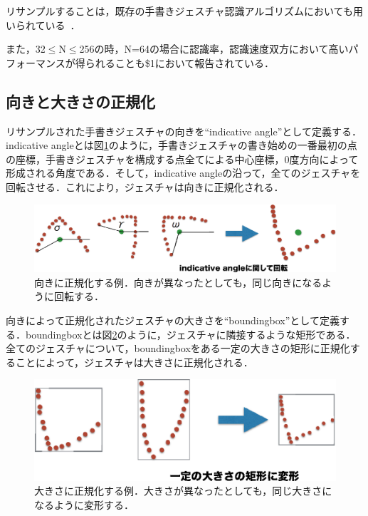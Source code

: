 リサンプルすることは，既存の手書きジェスチャ認識アルゴリズムにおいても用いられている~\cite{Plamondon:2000:OOH:331097.331275, Tappert:1990:SAO:83123.83137, Kristensson:2004:SLV:1029632.1029640, Zhai:2003:SWS:642611.642630, Tappert:1982:CSR:1664966.1664979}．


また，32$\leq$N$\leq$256の時，N=64の場合に認識率，認識速度双方において高いパフォーマンスが得られることも\$1において報告されている．

\subsection{向きと大きさの正規化}
リサンプルされた手書きジェスチャの向きを``indicative angle''として定義する．indicative angleとは図\ref{fig:orientation}のように，手書きジェスチャの書き始めの一番最初の点の座標，手書きジェスチャを構成する点全てによる中心座標，0度方向によって形成される角度である．そして，indicative angleの沿って，全てのジェスチャを回転させる．これにより，ジェスチャは向きに正規化される．

\begin{figure} [!h]
\centering
\includegraphics [width=0.8\columnwidth]{img/orientation.eps}
\caption{向きに正規化する例．向きが異なったとしても，同じ向きになるように回転する．}
\label{fig:orientation}
\end{figure}

向きによって正規化されたジェスチャの大きさを``boundingbox''として定義する．boundingboxとは図\ref{fig:size}のように，ジェスチャに隣接するような矩形である．全てのジェスチャについて，boundingboxをある一定の大きさの矩形に正規化することによって，ジェスチャは大きさに正規化される．

\begin{figure} [!h]
\centering
\includegraphics [width=0.7\columnwidth]{img/size.eps}
\caption{大きさに正規化する例．大きさが異なったとしても，同じ大きさになるように変形する．}
\label{fig:size}
\end{figure}

